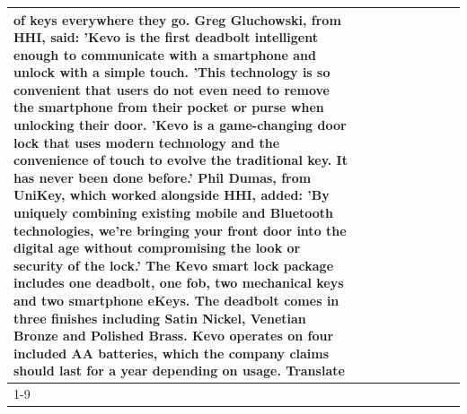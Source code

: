 \begin{table}[H]
\begin{tabular}{lllrlllll}
of keys everywhere they go. Greg Gluchowski, from HHI, said: 'Kevo is the first deadbolt intelligent enough to communicate with a smartphone and unlock with a simple touch. 'This technology is so convenient that users do not even need to remove the smartphone from their pocket or purse when unlocking their door. 'Kevo is a game-changing door lock that uses modern technology and the convenience of touch to evolve the traditional key. It has never been done before.' Phil Dumas, from UniKey, which worked alongside HHI, added: 'By uniquely combining existing mobile and Bluetooth technologies, we’re bringing your front door into the digital age without compromising the look or security of the lock.' The Kevo smart lock package includes one deadbolt, one fob, two mechanical keys and two smartphone eKeys. The deadbolt comes in three finishes including Satin Nickel, Venetian Bronze and Polished Brass. Kevo operates on four included AA batteries, which the company claims should last for a year depending on usage. Translate \\
\cline{1-9}

\end{tabular}
\end{table}
